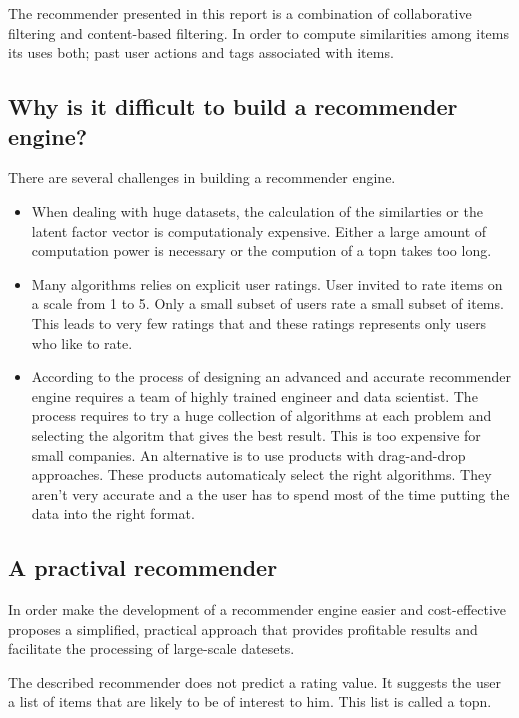 
The recommender presented in this report is a combination of collaborative filtering and content-based filtering. In order to compute similarities among items its uses both; past user actions and \glspl{tag} associated with items. 

\subsection{Why is it difficult to build a recommender engine?}

There are several challenges in building a recommender engine.

\begin{itemize}
\item When dealing with huge datasets, the calculation of the similarties or the latent factor vector is computationaly expensive. Either a large amount of computation power is necessary or the compution of a \gls{topn} takes too long.
\item Many algorithms relies on explicit user ratings. User invited to rate items on a scale from 1 to 5. Only a small subset of users rate a small subset of items. This leads to very few ratings that and these ratings represents only users who like to rate.
\item According to  \cite{Dunning14} the process of designing an advanced and accurate recommender engine requires a team of highly trained engineer and data scientist. The process requires to try a huge collection of algorithms at each problem and selecting the algoritm that gives the best result. This is too expensive for small companies. An alternative is to use products with drag-and-drop approaches. These products automaticaly select the right algorithms. They aren't very accurate and a the user has to spend most of the time putting the data into the right format.
\end{itemize}

\subsection{A practival recommender}
\label{sec:practical}

In order make the development of a recommender engine easier and cost-effective \cite{Dunning14} proposes a simplified, practical approach that provides profitable results and facilitate the processing of large-scale datesets. 

The described recommender does not predict a rating value. It suggests the user a list of items that are likely to be of interest to him. This list is called a \gls{topn}.

